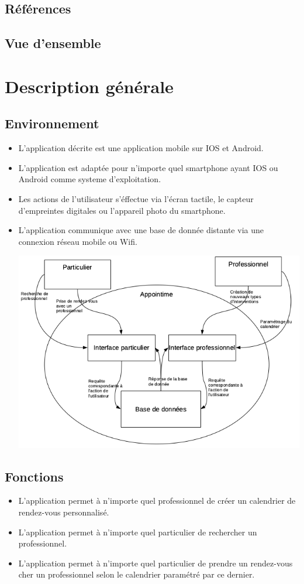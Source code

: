 \documentclass{article}
\begin{document}
\subsection{Références}

\subsection{Vue d'ensemble}


\section{Description générale}
\subsection{Environnement}
\begin{itemize}
\item L'application décrite est une application mobile sur IOS et
Android.
\item L'application est adaptée pour n'importe quel smartphone ayant IOS ou Android comme
systeme d'exploitation.
\item Les actions de l'utilisateur s'éffectue via l'écran
  tactile, le capteur d'empreintes digitales ou l'appareil photo du smartphone.
\item L'application communique avec une base de donnée distante
  via une connexion \og réseau mobile\fg{} ou Wifi.


\includegraphics[scale=0.5]{ShematDiagrammes/ShematGeneral.png}
\end{itemize}
\subsection{Fonctions}
\begin{itemize}
\item L'application permet à n'importe quel professionnel de créer un
calendrier de rendez-vous personnalisé.
\item L'application permet à n'importe quel particulier de rechercher
  un professionnel.
\item L'application permet à n'importe quel particulier de prendre un
  rendez-vous cher un professionnel selon le calendrier paramétré par
  ce dernier.
\end{itemize}
\end{document}
